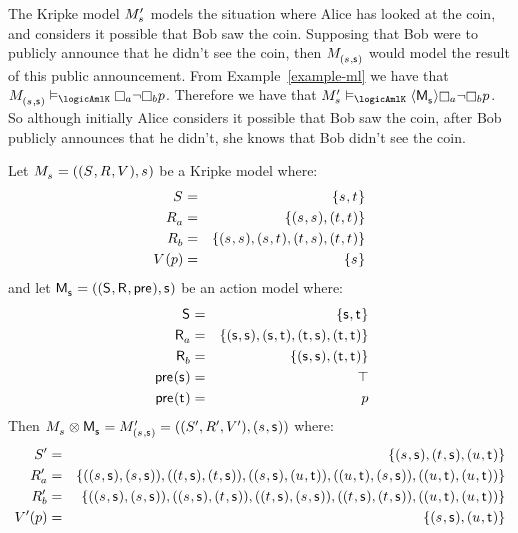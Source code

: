 \begin{example}
The Kripke model $\kPModelP{\kStateS}$ models the situation where Alice has looked at the coin, and considers it possible that Bob saw the coin.
Supposing that Bob were to publicly announce that he didn't see the coin, then $\kPModel{(\kStateS, \aStateS)}$ would model the result of this public announcement.
From Example~\ref{example-ml} we have that $\kPModel{(\kStateS, \aStateS)} \entails_\logicAmlK \knowsA \lnot \knowsB \atomP$.
Therefore we have that $\kPModelP{\kStateS} \entails_\logicAmlK \actionE{\aPModel{\aStateS}} \knowsA \lnot \knowsB \atomP$.
So although initially Alice considers it possible that Bob saw the coin, after Bob publicly announces that he didn't, she knows that Bob didn't see the coin.
\end{example}

\begin{example}\label{example-pal-ml-reverse}
Let $\kPModelAndTuple{\kStateS}$ be a Kripke model where:
\begin{eqnarray*}
    \kStates &=& \{\kStateS, \kStateT\}\\
    \kAccessibilityA &=& \{(\kStateS, \kStateS), (\kStateT, \kStateT)\}\\
    \kAccessibilityB &=& \{(\kStateS, \kStateS), (\kStateS, \kStateT), (\kStateT, \kStateS), (\kStateT, \kStateT)\}\\
    \kValuation(\atomP) &=& \{\kStateS\}
\end{eqnarray*}
and let $\aPModelAndTuple{\aStateS}$ be an action model where:
\begin{eqnarray*}
    \aStates &=& \{\aStateS, \aStateT\}\\
    \aAccessibilityA &=& \{(\aStateS, \aStateS), (\aStateS, \aStateT), (\aStateT, \aStateS), (\aStateT, \aStateT)\}\\\
    \aAccessibilityB &=& \{(\aStateS, \aStateS), (\aStateT, \aStateT)\}\\\
    \aPrecondition(\aStateS) &=& \top\\
    \aPrecondition(\aStateT) &=& \atomP
\end{eqnarray*}
Then $\kPModel{\kStateS} \exec \aPModel{\aStateS} = \kPModelAndTupleP{(\kStateS, \aStateS)}$ where:
\begin{eqnarray*}
    \kStatesP &=& \{(\kStateS, \aStateS), (\kStateT, \aStateS), (\kStateU, \aStateT)\}\\
    \kAccessibilityPA &=& \{((\kStateS, \aStateS), (\kStateS, \aStateS)), ((\kStateT, \aStateS), (\kStateT, \aStateS)), ((\kStateS, \aStateS), (\kStateU, \aStateT)), ((\kStateU, \aStateT), (\kStateS, \aStateS)), ((\kStateU, \aStateT), (\kStateU, \aStateT))\}\\
    \kAccessibilityPB &=& \{((\kStateS, \aStateS), (\kStateS, \aStateS)), ((\kStateS, \aStateS), (\kStateT, \aStateS)), ((\kStateT, \aStateS), (\kStateS, \aStateS)), ((\kStateT, \aStateS), (\kStateT, \aStateS)), ((\kStateU, \aStateT), (\kStateU, \aStateT))\}\\
    \kValuationP(\atomP) &=& \{(\kStateS, \aStateS), (\kStateU, \aStateT)\}
\end{eqnarray*}


\end{example}
